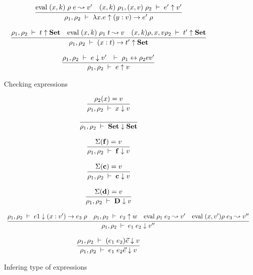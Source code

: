 \begin{figure}
\[\begin{array}{c}
	  \infer{\Check{\rho_1}{\rho_2}{\lam x . e}{\VPi{y}{v}{e'}{\rho}}}
          { \Eval{(x,k)\;\rho}{e}{v'} & \Check{(x,k)\;\rho_1}{(x,v)\;\rho_2}{e'}{v'}} 
\end{array}
\]

\[\begin{array}{c}
	  \infer{\Check{\rho_1}{\rho_2}{\EPi{x}{t}{t'}}{\Set}}
          {\IsType{\rho_1}{\rho_2}{t}  
	    & \Eval{(x,k)\;\rho_1}{t}{v}
	    & \IsType{(x,k)\rho}{{x,v}\rho_2}{t'}}
\end{array}
\]

\[\begin{array}{c}
	  \infer{\Check{\rho_1}{\rho_2}{e}{v}} 
          { \Infer{\rho_1}{\rho_2}{e}{v'} & \EqVal{\rho_1}{\rho_2}{e}{v'}} 
\end{array}
\]
\caption{Checking expressions}
\end{figure}

\begin{figure}
\[\begin{array}{c}
	  \infer{\Infer{\rho_1}{\rho_2}{x}{v}} 
          {\Lookup{\rho_2}{x}{v}}
\end{array}
\]

\[\begin{array}{c}
	  \infer{\Infer{\rho_1}{\rho_2}{\Set}{\Set}} 
          {}
\end{array}
\]

\[\begin{array}{c}
	  \infer{\Infer{\rho_1}{\rho_2}{\ff}{v}} 
          {\Lookup{\Sigma}{\ff}{v}}
\end{array}
\]

\[\begin{array}{c}
	  \infer{\Infer{\rho_1}{\rho_2}{\cc}{v}} 
          {\Lookup{\Sigma}{\cc}{v}}
\end{array}
\]

\[\begin{array}{c}
	  \infer{\Infer{\rho_1}{\rho_2}{\DD}{v}} 
          {\Lookup{\Sigma}{\dd}{v}}
\end{array}
\]

\[\begin{array}{c}
	  \infer{\Infer{\rho_1}{\rho_2}{e_1 \; e_2}{v''}}
{\Infer{\rho_1}{\rho_2}{e1}{\VPi{x}{v'}{e_3}{\rho}}
& \Check{\rho_1}{\rho_2}{e_2}{w}
& \Eval{\rho_1}{e_2}{v'}
& \Eval{(x,v')\rho}{e_3}{v''}}

\end{array}
\]

\[\begin{array}{c}
	  \infer{\Infer{\rho_1}{\rho_2}{e_1 \; e_2 \vec{e}}{v}
	  } 
          {\Infer{\rho_1}{\rho_2}{(e_1 \; e_2) \vec{e}}{v}}
\end{array}
\]



\caption{Infering type of expressions}
\end{figure}

